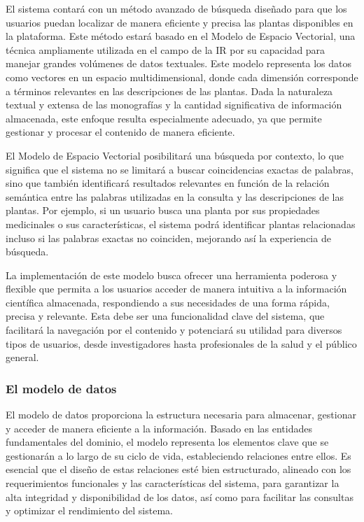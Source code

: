 El sistema contará con un método avanzado de búsqueda diseñado para que los usuarios puedan localizar de manera eficiente y 
precisa las plantas disponibles en la plataforma. Este método estará basado en el Modelo de Espacio Vectorial, una técnica 
ampliamente utilizada en el campo de la IR por su capacidad para manejar grandes volúmenes de datos textuales. 
Este modelo representa los datos como vectores en un espacio multidimensional, donde cada dimensión corresponde a términos 
relevantes en las descripciones de las plantas. Dada la naturaleza textual y extensa de las monografías y la cantidad 
significativa de información almacenada, este enfoque resulta especialmente adecuado, ya que permite gestionar y 
procesar el contenido de manera eficiente.

El Modelo de Espacio Vectorial posibilitará una búsqueda por contexto, lo que significa que el sistema no se limitará a 
buscar coincidencias exactas de palabras, sino que también identificará resultados relevantes en función de la relación 
semántica entre las palabras utilizadas en la consulta y las descripciones de las plantas. Por ejemplo, si un usuario 
busca una planta por sus propiedades medicinales o sus características, el sistema podrá identificar plantas relacionadas 
incluso si las palabras exactas no coinciden, mejorando así la experiencia de búsqueda.

La implementación de este modelo busca ofrecer una herramienta poderosa y flexible que permita a los usuarios acceder 
de manera intuitiva a la información científica almacenada, respondiendo a sus necesidades de una forma rápida, 
precisa y relevante. Esta debe ser una funcionalidad clave del sistema, que facilitará la navegación por el contenido 
y potenciará su utilidad para diversos tipos de usuarios, desde investigadores hasta profesionales de la salud y 
el público general.


\subsubsection{El modelo de datos}
El modelo de datos proporciona la estructura necesaria para almacenar, gestionar y acceder de manera eficiente a la información. 
Basado en las entidades fundamentales del dominio, el modelo representa los elementos clave que se gestionarán a lo largo de su 
ciclo de vida, estableciendo relaciones entre ellos. Es esencial que el diseño de estas relaciones esté bien estructurado, 
alineado con los requerimientos funcionales y las características del sistema, para garantizar la alta integridad y disponibilidad 
de los datos, así como para facilitar las consultas y optimizar el rendimiento del sistema.

